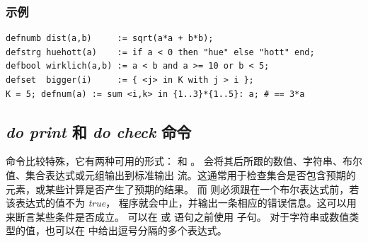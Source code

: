 \subsubsection{示例}
{\small
\begin{verbatim}
defnumb dist(a,b)     := sqrt(a*a + b*b);
defstrg huehott(a)    := if a < 0 then "hue" else "hott" end;
defbool wirklich(a,b) := a < b and a >= 10 or b < 5;
defset  bigger(i)     := { <j> in K with j > i };
K = 5; defnum(a) := sum <i,k> in {1..3}*{1..5}: a; # == 3*a
\end{verbatim}
}


\subsection{\emph{do print} 和 \emph{do check} 命令}
 命令比较特殊，它有两种可用的形式： 和 。
 会将其后所跟的数值、字符串、布尔值、集合表达式或元组输出到标准输出
流。这通常用于检查集合是否包含预期的元素，或某些计算是否产生了预期的结果。
而 则必须跟在一个布尔表达式前，若该表达式的值不为 \emph{true}，
程序就会中止，并输出一条相应的错误信息。这可以用来断言某些条件是否成立。
可以在  或  语句之前使用  子句。  
对于字符串或数值类型的值，也可以在  中给出逗号分隔的多个表达式。

